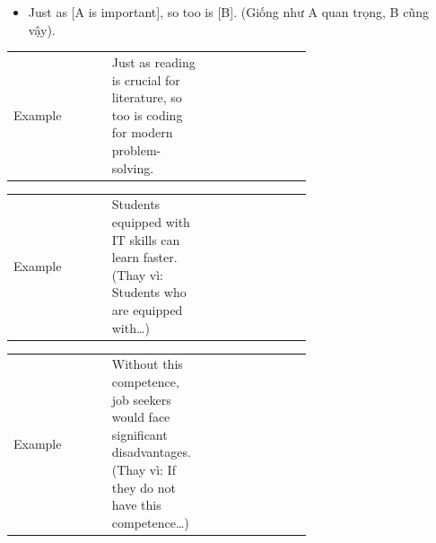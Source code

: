 
\begin{itemize}
\tightlist
\item
  Just as {[}A is important{]}, so too is {[}B{]}. (Giống như A quan
  trọng, B cũng vậy).
\end{itemize}

\begingroup
\sloppy
\renewcommand{\tabularxcolumn}[1]{>{\RaggedRight\arraybackslash}m{#1}}
\setlength{\tabcolsep}{6pt}
\renewcommand{\arraystretch}{1.15}
\begin{cdtablebox}
\begin{tabularx}{\linewidth}{|M{0.33\linewidth}|M{0.33\linewidth}|Y|}
\hline
{}  &  &  \\ \hline
Example & Just as reading is crucial for literature, so too is coding for modern problem-solving.\allowbreak{} &  \\ \hline
\end{tabularx}
\end{cdtablebox}
\endgroup


\begingroup
\sloppy
\renewcommand{\tabularxcolumn}[1]{>{\RaggedRight\arraybackslash}m{#1}}
\setlength{\tabcolsep}{6pt}
\renewcommand{\arraystretch}{1.15}
\begin{cdtablebox}
\begin{tabularx}{\linewidth}{|M{0.33\linewidth}|M{0.33\linewidth}|Y|}
\hline
{}  &  &  \\ \hline
Example & Students equipped with IT skills can learn faster.\allowbreak{} (Thay vì: Students who are equipped with…) &  \\ \hline
\end{tabularx}
\end{cdtablebox}
\endgroup


\begingroup
\sloppy
\renewcommand{\tabularxcolumn}[1]{>{\RaggedRight\arraybackslash}m{#1}}
\setlength{\tabcolsep}{6pt}
\renewcommand{\arraystretch}{1.15}
\begin{cdtablebox}
\begin{tabularx}{\linewidth}{|M{0.33\linewidth}|M{0.33\linewidth}|Y|}
\hline
{}  &  &  \\ \hline
Example & Without this competence, job seekers would face significant disadvantages.\allowbreak{} (Thay vì: If they do not have this competence…) &  \\ \hline
\end{tabularx}
\end{cdtablebox}
\endgroup

